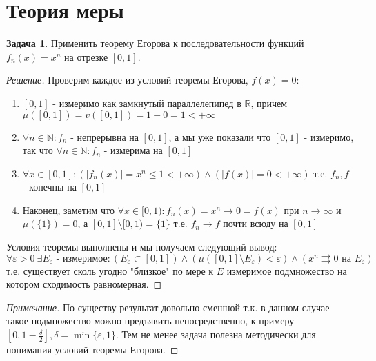 \documentclass[12pt,a4paper]{article}
\theoremstyle{definition}
\newtheorem{exercise}{Задача}[section]
\newenvironment{solution}
{\renewcommand\qedsymbol{$\blacksquare$}\begin{proof}[Решение]}
{\end{proof}}
\newenvironment{note}
{\renewcommand\qedsymbol{}\begin{proof}[Примечание]}
	{\end{proof}}
\newcommand{\Real}{\mathbb{R}}
\newcommand{\Natural}{\mathbb{N}}
\begin{document}
\section{Теория меры}
	
\begin{exercise}
	Применить теорему Егорова к последовательности функций $f_n(x) = x^n$ на отрезке $[0,1]$.
\end{exercise}
\begin{solution}
	Проверим каждое из условий теоремы Егорова, $f(x) = 0$:
	\begin{enumerate}
		\item $[0,1]$ - измеримо как замкнутый параллелепипед в $\Real$, причем \newline $\mu([0,1]) = v([0,1]) = 1-0 = 1 < +\infty$
	
		\item $\forall n \in \Natural: f_n \text{ - непрерывна на } [0,1]$, а мы уже показали что $[0,1]$ - измеримо, так что $\forall n \in \Natural: f_n \text{ - измерима на } [0,1]$
			
		\item $\forall x \in [0, 1]: (|f_n(x)| = x^n \leq 1 < +\infty) \wedge (|f(x)| = 0 < +\infty)$ т.е. $f_n, f$ - конечны на $[0,1]$
			
		\item Наконец, заметим что $\forall x \in [0,1): f_n(x) = x^n \to 0 = f(x)$ при $n \to \infty$ и $\mu(\{1\}) = 0$, а $[0,1] \setminus [0,1) = \{1\}$ т.е. $f_n \to f$ почти всюду на $[0,1]$
	\end{enumerate}
	
	Условия теоремы выполнены и мы получаем следующий вывод: $$\forall \varepsilon > 0 \: \exists E_{\varepsilon} \text{ - измеримое}: (E_{\varepsilon} \subset [0,1]) \wedge (\mu([0,1]\setminus E_{\varepsilon}) < \varepsilon) \wedge (x^n \rightrightarrows 0 \text{ на } E_{\varepsilon})$$ т.е. существует сколь угодно "близкое" по мере к $E$ измеримое подмножество на котором сходимость равномерная. 
\end{solution}

\begin{note}
	По существу результат довольно смешной т.к. в данном случае такое подмножество можно предъявить непосредственно, к примеру $[0, 1 - \frac{\delta}{2}], \delta = \min\{\varepsilon, 1\}$. Тем не менее задача полезна методически для понимания условий теоремы Егорова.
\end{note}

\newpage	
\end{document}
